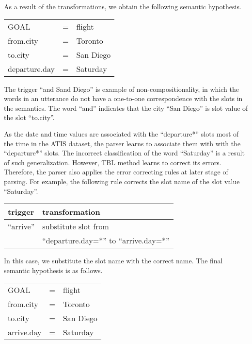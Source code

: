 \documentclass{article}
\begin{document}
As a result of the transformations, we obtain the following semantic hypothesis. 

\vspace{.15cm}
\begin{tabular}{lll}
  GOAL          & = & flight \\
  from.city     & = & Toronto \\
  to.city       & = & San Diego \\
  departure.day & = & Saturday \\
\end{tabular} 
\vspace{.15cm}

The trigger ``and Sand Diego'' is example of non-compositionality, in which the words in an utterance do not have a one-to-one correspondence with the slots in the semantics. The word ``and'' indicates that the city ``San Diego'' is slot value of the slot ``to.city''. 


As the date and time values are associated with the ``departure*'' slots most of the time in the ATIS dataset,  
the parser learns to associate them with with the ``departure*'' slots. The incorrect classification of the word ``Saturday'' is a result of such generalization. 
However, TBL method learns to correct its errors. Therefore, the parser also applies the error correcting rules at later stage of parsing. For example, the following rule corrects the slot name of the slot value ``Saturday''.

\vspace{.15cm}
\begin{tabular}{ll}
  trigger & transformation \\
  \hline 
  ``arrive''            & substitute slot from\\
                        & ``departure.day=*'' to ``arrive.day=*'' \\
\end{tabular} 
\vspace{.15cm}

In this case, we substitute the slot name with the correct name. The final semantic hypothesis is as follows.

\vspace{.15cm}
\begin{tabular}{lll}
  GOAL          & = & flight \\
  from.city     & = & Toronto \\
  to.city       & = & San Diego \\
  arrive.day    & = & Saturday \\
\end{tabular} 
\vspace{.15cm}
\end{document}
